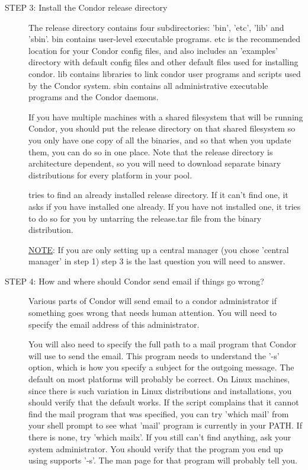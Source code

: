 \begin{description}
\item[STEP 3: Install the Condor release directory] 
     The release directory contains four subdirectories: 'bin', 'etc',
     'lib' and 'sbin'.  bin contains user-level executable programs.
     etc is the recommended location for your Condor config files, and
     also includes an 'examples' directory with default config files
     and other default files used for installing condor.  lib contains
     libraries to link condor user programs and scripts used by the
     Condor system.  sbin contains all administrative executable
     programs and the Condor daemons.  

     If you have multiple machines with a shared filesystem that will
     be running Condor, you should put the release directory on that
     shared filesystem so you only have one copy of all the binaries,
     and so that when you update them, you can do so in one place.
     Note that the release directory is architecture dependent, so you
     will need to download separate binary distributions for every
     platform in your pool.

      tries to find an already installed release
     directory.  If it can't find one, it asks if you have installed
     one already.  If you have not installed one, it tries to do so
     for you by untarring the release.tar file from the binary
     distribution.  

\underline{NOTE}: If you are only setting up a central manager (you chose 'central
     manager' in step 1) step 3 is the last question you will need to
     answer.

\item[STEP 4: How and where should Condor send email if things go wrong?]

     Various parts of Condor will send email to a condor administrator
     if something goes wrong that needs human attention.  You will
     need to specify the email address of this administrator.  

     You will also need to specify the full path to a mail program
     that Condor will use to send the email.  This program needs to
     understand the '-s' option, which is how you specify a subject
     for the outgoing message.  The default on most platforms will
     probably be correct.  On Linux machines, since there is such
     variation in Linux distributions and installations, you should
     verify that the default works.  If the script complains that it
     cannot find the mail program that was specified, you can try
     'which mail' from your shell prompt to see what 'mail' program is
     currently in your PATH.  If there is none, try 'which mailx'.  If
     you still can't find anything, ask your system administrator.
     You should verify that the program you end up using supports
     '-s'.  The man page for that program will probably tell you.


\end{description}
